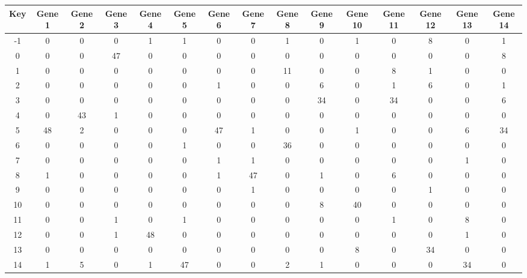 \begin{tabular}{|c|c|c|c|c|c|c|c|c|c|c|c|c|c|c|}
\hline
Key & Gene 1 & Gene 2 & Gene 3 & Gene 4 & Gene 5 & Gene 6 & Gene 7 & Gene 8 & Gene 9 & Gene 10 & Gene 11 & Gene 12 & Gene 13 & Gene 14 \\
\hline
-1 & 0 & 0 & 0 & 1 & 1 & 0 & 0 & 1 & 0 & 1 & 0 & 8 & 0 & 1 \\
0 & 0 & 0 & 47 & 0 & 0 & 0 & 0 & 0 & 0 & 0 & 0 & 0 & 0 & 8 \\
1 & 0 & 0 & 0 & 0 & 0 & 0 & 0 & 11 & 0 & 0 & 8 & 1 & 0 & 0 \\
2 & 0 & 0 & 0 & 0 & 0 & 1 & 0 & 0 & 6 & 0 & 1 & 6 & 0 & 1 \\
3 & 0 & 0 & 0 & 0 & 0 & 0 & 0 & 0 & 34 & 0 & 34 & 0 & 0 & 6 \\
4 & 0 & 43 & 1 & 0 & 0 & 0 & 0 & 0 & 0 & 0 & 0 & 0 & 0 & 0 \\
5 & 48 & 2 & 0 & 0 & 0 & 47 & 1 & 0 & 0 & 1 & 0 & 0 & 6 & 34 \\
6 & 0 & 0 & 0 & 0 & 1 & 0 & 0 & 36 & 0 & 0 & 0 & 0 & 0 & 0 \\
7 & 0 & 0 & 0 & 0 & 0 & 1 & 1 & 0 & 0 & 0 & 0 & 0 & 1 & 0 \\
8 & 1 & 0 & 0 & 0 & 0 & 1 & 47 & 0 & 1 & 0 & 6 & 0 & 0 & 0 \\
9 & 0 & 0 & 0 & 0 & 0 & 0 & 1 & 0 & 0 & 0 & 0 & 1 & 0 & 0 \\
10 & 0 & 0 & 0 & 0 & 0 & 0 & 0 & 0 & 8 & 40 & 0 & 0 & 0 & 0 \\
11 & 0 & 0 & 1 & 0 & 1 & 0 & 0 & 0 & 0 & 0 & 1 & 0 & 8 & 0 \\
12 & 0 & 0 & 1 & 48 & 0 & 0 & 0 & 0 & 0 & 0 & 0 & 0 & 1 & 0 \\
13 & 0 & 0 & 0 & 0 & 0 & 0 & 0 & 0 & 0 & 8 & 0 & 34 & 0 & 0 \\
14 & 1 & 5 & 0 & 1 & 47 & 0 & 0 & 2 & 1 & 0 & 0 & 0 & 34 & 0 \\
\hline
\end{tabular}